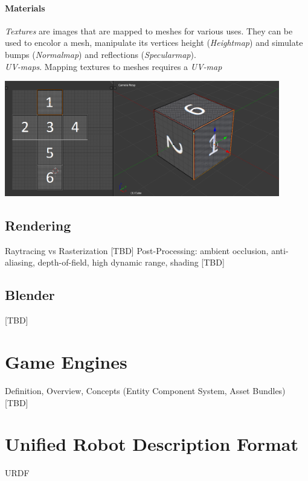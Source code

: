 \paragraph{Materials} \textit{Textures} are images that are mapped to meshes for various uses. They can be used to encolor a mesh, manipulate its vertices height (\textit{Heightmap})\cite{UnityDocHeightmap} and simulate bumps (\textit{Normalmap}\cite{UnityDocNormalmap}\cite{Cohen:1998:AS:280814.280832}\cite{745285}) and reflections (\textit{Specularmap})\cite{UnityDocSpecularmap}.\\
\textit{UV-maps}.
Mapping textures to meshes requires a \textit{UV-map}

\begin{center}
\noindent\includegraphics[width=12cm]{tex/img/ch03/CubeUVMapping.png}
\label{fig:3d-cube-uv-mapping}
\end{center}

\subsection{Rendering}
Raytracing \cite{Plemenos2010} vs Rasterization [TBD]
Post-Processing: ambient occlusion, anti-aliasing, depth-of-field, high dynamic range, shading [TBD]


\subsection{Blender}
[TBD]

\section{Game Engines}
Definition, Overview, Concepts (Entity Component System, Asset Bundles) [TBD]

\section{Unified Robot Description Format}
\ac{URDF}
